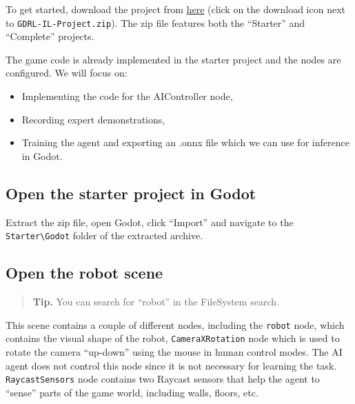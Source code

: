 \documentclass[11pt,a4paper]{article}
\begin{document}
To get started, download the project from \href{https://huggingface.co/ivan267/imitation-learning-tutorial-godot-project/tree/main}{here} (click on the download icon next to \passthrough{\lstinline!GDRL-IL-Project.zip!}). The zip file features both the ``Starter'' and ``Complete'' projects.

The game code is already implemented in the starter project and the nodes are configured. We will focus on:

\begin{itemize}
\tightlist
\item
  Implementing the code for the AIController node,
\item
  Recording expert demonstrations,
\item
  Training the agent and exporting an .onnx file which we can use for inference in Godot.
\end{itemize}

\subsection{Open the starter project in Godot}\label{open-the-starter-project-in-godot}

Extract the zip file, open Godot, click ``Import'' and navigate to the \passthrough{\lstinline!Starter\\Godot!} folder of the extracted archive.

\subsection{Open the robot scene}\label{open-the-robot-scene}

\begin{quote}
\textbf{Tip.} You can search for ``robot'' in the FileSystem search.
\end{quote}

This scene contains a couple of different nodes, including the \passthrough{\lstinline!robot!} node, which contains the visual shape of the robot, \passthrough{\lstinline!CameraXRotation!} node which is used to rotate the camera ``up-down'' using the mouse in human control modes. The AI agent does not control this node since it is not necessary for learning the task. \passthrough{\lstinline!RaycastSensors!} node contains two Raycast sensors that help the agent to ``sense'' parts of the game world, including walls, floors, etc.

\end{document}
